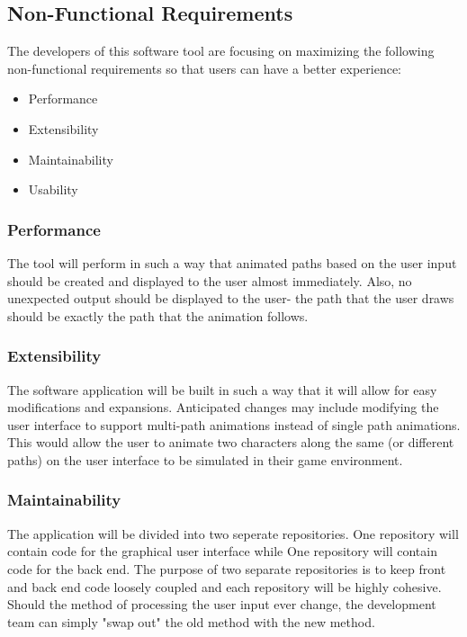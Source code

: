 \subsection{Non-Functional Requirements}
The developers of this software tool are focusing on maximizing the following non-functional requirements so that users can have a better experience:

\begin{itemize}
 \item Performance
 \item Extensibility
 \item Maintainability
 \item Usability
\end{itemize}

\subsubsection{Performance}
The tool will perform in such a way that animated paths based on the user input should be created and displayed to the user almost immediately. Also, no unexpected output should be displayed to the user- the path that the user draws should be exactly the path that the animation follows.

\subsubsection{Extensibility}
The software application will be built in such a way that it will allow for easy modifications and expansions. Anticipated changes may include modifying the user interface to support multi-path animations instead of single path animations. This would allow the user to animate two characters along the same (or different paths) on the user interface to be simulated in their game environment.

\subsubsection{Maintainability}
The application will be divided into two seperate repositories. One repository will contain code for the graphical user interface while One repository will contain code for the back end. The purpose of two separate repositories is to keep front and back end code loosely coupled and each repository will be highly cohesive. Should the method of processing the user input ever change, the development team can simply "swap out" the old method with the new method.

